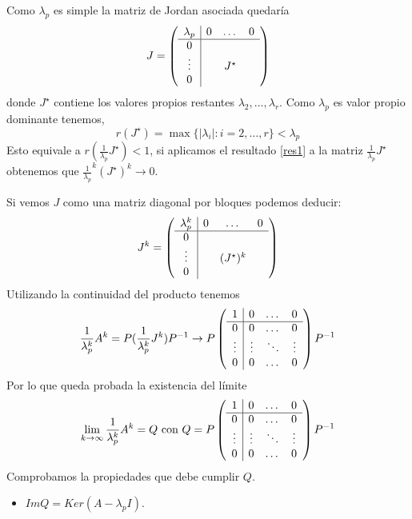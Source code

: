 \documentclass[size=a4, parskip=half, titlepage=false, toc=flat, toc=bib, 12pt, twoside]{scrartcl}
\makeatletter
\renewenvironment{proof}[1][\proofname] {\par\pushQED{\qed}\normalfont\topsep6\p@\@plus6\p@\relax\trivlist\item[\hskip\labelsep\itshape\tgpaella#1\@addpunct{.}]\ignorespaces}{\popQED\endtrivlist\@endpefalse}
\theoremstyle{theorem-style}
\theoremstyle{definition-style}
\theoremstyle{remark-style}
\theoremstyle{example-style}
\theoremstyle{definition-style}
\theoremstyle{remark-style}
\renewcommand{\proofname}{\normalfont\tgpaella\bfseries\small DEMOSTRACIÓN}
\makeatother
\begin{document}
\begin{proof}
Como $\lambda_p$ es simple la matriz de Jordan asociada quedaría $$
  J =
    \left(
      \begin{array}{{c|ccc}}
        \lambda_p     &    0      &   \dots    & 0\\\hline
            0         &           &        &  \\
            \vdots    &           & J^{\star} &  \\
           0          &           &        &
      \end{array}
    \right)
$$ donde $J^{\star}$ contiene los valores propios restantes $\lambda_2, \dots, \lambda_r$.
Como $\lambda_p$ es valor propio dominante tenemos,
$$r(J^{\star}) = \max \{ |\lambda_i| : i = 2, \dots , r \} < \lambda_p $$
Esto equivale a $r(\frac{1}{\lambda_p} J^{\star}) < 1$, si aplicamos el resultado \ref{res1} a la matriz $\frac{1}{\lambda_p} J^{\star}$ obtenemos que $\frac{1}{\lambda_p}^k (J^{\star})^k \rightarrow 0$.

Si vemos $J$ como una matriz diagonal por bloques podemos deducir:
$$J^k =      \left(
      \begin{array}{{c|ccc}}
        \lambda_p^k     &    0      &   \dots    & 0\\\hline
            0         &           &        &  \\
            \vdots    &           & (J^{\star})^k &  \\
           0          &           &        &
      \end{array}
    \right)$$
Utilizando la continuidad del producto tenemos
$$\frac{1}{\lambda_p^k} A^k = P (\frac{1}{\lambda_p^k}  J^k)P^{-1} \rightarrow P \left(
      \begin{array}{{c|ccc}}
            1         &    0      &   \dots    & 0\\\hline
            0         &    0       &    \dots    & 0 \\
            \vdots    &    \vdots  &  \ddots &  \vdots \\
           0          &     0       &    \dots    & 0
      \end{array}   \right) P^{-1}$$
Por lo que queda probada la existencia del límite
$$\lim_{k \to \infty} \frac{1}{\lambda_p^k} A^k  = Q \  \textrm{con} \ Q = P \left(
      \begin{array}{{c|ccc}}
            1         &    0      &   \dots    & 0\\\hline
            0         &    0       &    \dots    & 0 \\
            \vdots    &    \vdots  &  \ddots &  \vdots \\
           0          &     0       &    \dots    & 0
      \end{array}   \right) P^{-1} $$
Comprobamos la propiedades que debe cumplir $Q$.
\begin{itemize}
\item $Im Q = Ker (A - \lambda_p I)$.


\end{itemize}
\end{proof}
\end{document}
